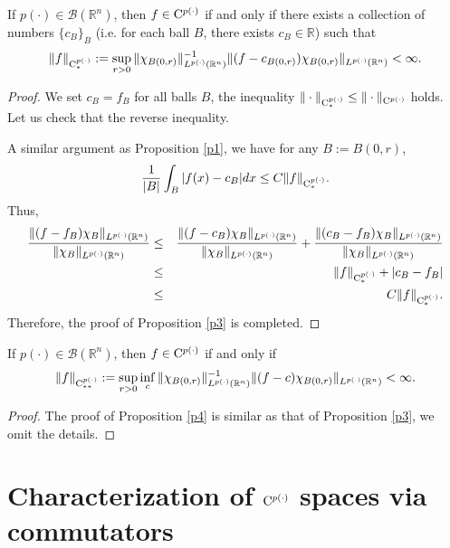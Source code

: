 \documentclass{amse-new}
\numberwithin{equation}{section} %
\begin{document}
\begin{proposition}\label{p3}
If $p(\cdot)\in \mathcal{B}(\mathbb{R}^n)$, then $f\in {\rm C}^{p(\cdot)}$ if and only if there exists a collection of numbers $\{c_{B}\}_{B}$ (i.e. for each ball $B$, there exists $c_{B}\in \mathbb{R}$) such that
$$\|f\|_{{\rm C}_{*}^{p(\cdot)}}
:=\sup_{r>0}\|\chi_{B(0,r)}\|^{-1}_{L^{p(\cdot)}(\mathbb{R}^n)}\|(f-c_{B(0,r)})\chi_{B(0,r)}\|_{L^{p(\cdot)}(\mathbb{R}^n)}<\infty.$$
\end{proposition}
\begin{proof}
We set $c_{B}=f_{B}$ for all balls $B$, the inequality $\|\cdot\|_{{\rm C}_{*}^{p(\cdot)}}\leq \|\cdot\|_{{\rm C}^{p(\cdot)}}$ holds. Let us check that the reverse inequality.

A similar argument as Proposition \ref{p1}, we have for any $B:=B(0,r)$,
\begin{eqnarray*}
\frac{1}{|B|}\int_{B}|f(x)-c_{B}|dx\leq C\|f\|_{{\rm C}_{*}^{p(\cdot)}}.
\end{eqnarray*}
Thus,
\begin{eqnarray*}
\frac{\|(f-f_{B})\chi_{B}\|_{L^{p(\cdot)}(\mathbb{R}^n)}}{\|\chi_{B}\|_{L^{p(\cdot)}(\mathbb{R}^n)}}
&\leq& \frac{\|(f-c_{B})\chi_{B}\|_{L^{p(\cdot)}(\mathbb{R}^n)}}{\|\chi_{B}\|_{L^{p(\cdot)}(\mathbb{R}^n)}}
+\frac{\|(c_{B}-f_{B})\chi_{B}\|_{L^{p(\cdot)}(\mathbb{R}^n)}}{\|\chi_{B}\|_{L^{p(\cdot)}(\mathbb{R}^n)}}\\
&\leq& \|f\|_{{\rm C}_{*}^{p(\cdot)}}+|c_{B}-f_{B}|\\
&\leq& C\|f\|_{{\rm C}_{*}^{p(\cdot)}}.
\end{eqnarray*}
Therefore, the proof of Proposition \ref{p3} is completed.
\end{proof}
\begin{proposition}\label{p4}
If $p(\cdot)\in \mathcal{B}(\mathbb{R}^n)$, then $f\in {\rm C}^{p(\cdot)}$ if and only if
$$\|f\|_{{\rm C}_{**}^{p(\cdot)}}
:=\sup_{r>0}\inf_{c}\|\chi_{B(0,r)}\|^{-1}_{L^{p(\cdot)}(\mathbb{R}^n)}\|(f-c)\chi_{B(0,r)}\|_{L^{p(\cdot)}(\mathbb{R}^n)}<\infty.$$
\end{proposition}
\begin{proof}
The proof of Proposition \ref{p4} is similar as that of Proposition \ref{p3}, we omit the details.
\end{proof}
\section{Characterization of ${\rm C}^{p(\cdot)}$ spaces via commutators}
\end{document}
